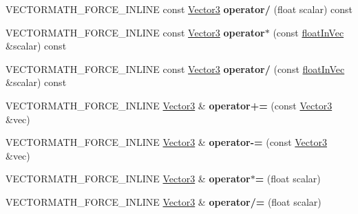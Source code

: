 \begin{DoxyCompactItemize}
V\+E\+C\+T\+O\+R\+M\+A\+T\+H\+\_\+\+F\+O\+R\+C\+E\+\_\+\+I\+N\+L\+I\+NE const \hyperlink{classVectormath_1_1Aos_1_1Vector3}{Vector3} {\bfseries operator/} (float scalar) const
\item 
\mbox{\label{classVectormath_1_1Aos_1_1Vector3_a7d68682d95c01f3d1a7633e39325cb7a}} 
V\+E\+C\+T\+O\+R\+M\+A\+T\+H\+\_\+\+F\+O\+R\+C\+E\+\_\+\+I\+N\+L\+I\+NE const \hyperlink{classVectormath_1_1Aos_1_1Vector3}{Vector3} {\bfseries operator$\ast$} (const \hyperlink{classVectormath_1_1floatInVec}{float\+In\+Vec} \&scalar) const
\item 
\mbox{\label{classVectormath_1_1Aos_1_1Vector3_a19d109f8dea0f8eb40af835e71d1b5b5}} 
V\+E\+C\+T\+O\+R\+M\+A\+T\+H\+\_\+\+F\+O\+R\+C\+E\+\_\+\+I\+N\+L\+I\+NE const \hyperlink{classVectormath_1_1Aos_1_1Vector3}{Vector3} {\bfseries operator/} (const \hyperlink{classVectormath_1_1floatInVec}{float\+In\+Vec} \&scalar) const
\item 
\mbox{\label{classVectormath_1_1Aos_1_1Vector3_a8789262444893a359053014901735479}} 
V\+E\+C\+T\+O\+R\+M\+A\+T\+H\+\_\+\+F\+O\+R\+C\+E\+\_\+\+I\+N\+L\+I\+NE \hyperlink{classVectormath_1_1Aos_1_1Vector3}{Vector3} \& {\bfseries operator+=} (const \hyperlink{classVectormath_1_1Aos_1_1Vector3}{Vector3} \&vec)
\item 
\mbox{\label{classVectormath_1_1Aos_1_1Vector3_a20c40d65588b8cd944563e7ccfbfc0cd}} 
V\+E\+C\+T\+O\+R\+M\+A\+T\+H\+\_\+\+F\+O\+R\+C\+E\+\_\+\+I\+N\+L\+I\+NE \hyperlink{classVectormath_1_1Aos_1_1Vector3}{Vector3} \& {\bfseries operator-\/=} (const \hyperlink{classVectormath_1_1Aos_1_1Vector3}{Vector3} \&vec)
\item 
\mbox{\label{classVectormath_1_1Aos_1_1Vector3_a6e6f042308c5088cbdf3d30c24a9e80f}} 
V\+E\+C\+T\+O\+R\+M\+A\+T\+H\+\_\+\+F\+O\+R\+C\+E\+\_\+\+I\+N\+L\+I\+NE \hyperlink{classVectormath_1_1Aos_1_1Vector3}{Vector3} \& {\bfseries operator$\ast$=} (float scalar)
\item 
\mbox{\label{classVectormath_1_1Aos_1_1Vector3_a3a36769bd188e8c1065a390a1c1a8118}} 
V\+E\+C\+T\+O\+R\+M\+A\+T\+H\+\_\+\+F\+O\+R\+C\+E\+\_\+\+I\+N\+L\+I\+NE \hyperlink{classVectormath_1_1Aos_1_1Vector3}{Vector3} \& {\bfseries operator/=} (float scalar)

\end{DoxyCompactItemize}
